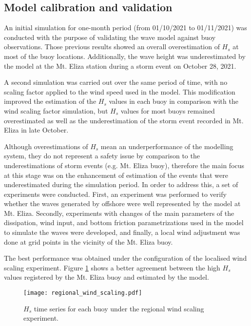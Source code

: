 \documentclass[12pt]{article}
\begin{document}
\subsection{Model calibration and validation}

An initial simulation for one-month period (from 01/10/2021 to 01/11/2021) was conducted with the purpose of validating the wave model against buoy observations. Those previous results showed an overall overestimation of $H_{s}$ at most of the buoy locations. Additionally, the wave height was underestimated by the model at the Mt. Eliza station during a storm event on October 28, 2021.

A second simulation was carried out over the same period of time, with no scaling factor applied to the wind speed used in the model. This modification improved the estimation of the $H_{s}$ values in each buoy in comparison with the wind scaling factor simulation, but $H_{s}$ values for most buoys remained overestimated as well as the underestimation of the storm event recorded in Mt. Eliza in late October.

Although overestimations of $H_{s}$ mean an underperformance of the modelling system, they do not represent a safety issue by comparison to the underestimations of storm events (e.g. Mt. Eliza buoy), therefore the main focus at this stage was on the enhancement of estimation of the events that were underestimated during the simulation period. In order to address this, a set of experiments were conducted. First, an experiment was performed to verify whether the waves generated by offshore were well represented by the model at Mt. Eliza. Secondly, experiments with changes of the main parameters of the dissipation, wind input, and bottom friction parametrizations used in the model to simulate the waves were developed, and finally, a local wind adjustment was done at grid points in the vicinity of the Mt. Eliza buoy.

The best performance was obtained under the configuration of the localised wind scaling experiment. Figure \ref{fig:regional_wind_scaling} shows a better agreement between the high $H_{s}$ values registered by the Mt. Eliza buoy and estimated by the model.

\begin{figure}[p]
    \centering
    \texttt{[image: regional\_wind\_scaling.pdf]}
    \caption{$H_{s}$ time series for each buoy under the regional wind scaling experiment.}
    \label{fig:regional_wind_scaling}
\end{figure}
\end{document}
